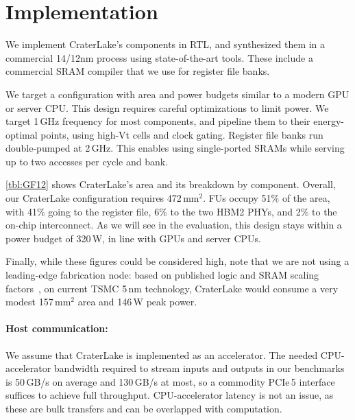 \section{Implementation}\label{sec:implementation}

\tblGF

We implement CraterLake's components in RTL, and synthesized them in a
commercial 14/12nm process using state-of-the-art tools. These include a
commercial SRAM compiler that we use for register file banks.

We target a configuration with area and power budgets similar to a
modern GPU or server CPU. This design requires careful optimizations to limit
power. We target 1\,GHz frequency for most components, and pipeline them to
their energy-optimal points, using high-Vt cells and clock gating. Register
file banks run double-pumped at 2\,GHz. This enables using single-ported
SRAMs while serving up to two accesses per cycle and bank.

\autoref{tbl:GF12} shows CraterLake's area and its breakdown by component.
Overall, our CraterLake configuration requires 472\,mm$^2$. FUs occupy 51\% of
the area, with 41\% going to the register file, 6\% to the two HBM2 PHYs, and
2\% to the on-chip interconnect. As we will see in the evaluation, this design
stays within a power budget of 320\,W, in line with GPUs and server CPUs.

Finally, while these figures could be considered high, note that we are not
using a leading-edge fabrication node: based on published logic and SRAM
scaling factors~\cite{yeap:iedm19:tsmc-n5}, on current TSMC 5\,nm technology,
CraterLake would consume a very modest 157\,mm$^\textrm{2}$ area and 146\,W
peak power.

\paragraph{Host communication:}
We assume that CraterLake is implemented as an accelerator. The needed
CPU-accelerator bandwidth required to stream inputs and outputs in our
benchmarks is 50\,GB/s on average and 130\,GB/s at most, so a commodity PCIe\,5
interface suffices to achieve full throughput. CPU-accelerator latency is not
an issue, as these are bulk transfers and can be overlapped with computation.

